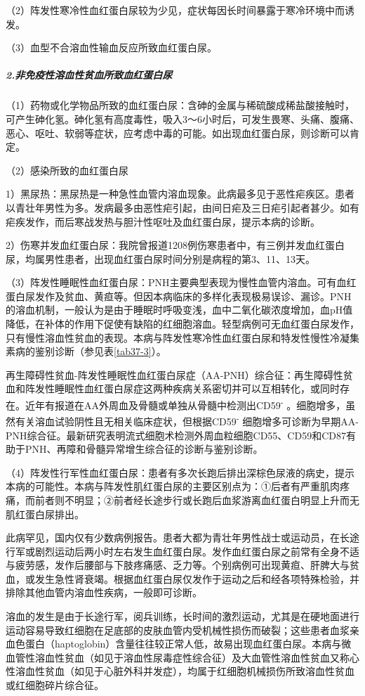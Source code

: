 （2）阵发性寒冷性血红蛋白尿较为少见，症状每因长时间暴露于寒冷环境中而诱发。

（3）血型不合溶血性输血反应所致血红蛋白尿。

\subparagraph{2.非免疫性溶血性贫血所致血红蛋白尿}

（1）药物或化学物品所致的血红蛋白尿：含砷的金属与稀硫酸成稀盐酸接触时，可产生砷化氢。砷化氢有高度毒性，吸入3～6小时后，可发生畏寒、头痛、腹痛、恶心、呕吐、软弱等症状，应考虑中毒的可能。如出现血红蛋白尿，则诊断可以肯定。

（2）感染所致的血红蛋白尿

1）黑尿热：黑尿热是一种急性血管内溶血现象。此病最多见于恶性疟疾区。患者以青壮年男性为多。发病最多由恶性疟引起，由间日疟及三日疟引起者甚少。如有疟疾发作，而后寒战发热与胆汁性呕吐及血红蛋白尿，提示本病的诊断。

2）伤寒并发血红蛋白尿：我院曾报道1208例伤寒患者中，有三例并发血红蛋白尿，均属男性患者，出现血红蛋白尿时间分别是病程的第3、11、13天。

（3）阵发性睡眠性血红蛋白尿：PNH主要典型表现为慢性血管内溶血。可有血红蛋白尿发作及贫血、黄疸等。但因本病临床的多样化表现极易误诊、漏诊。PNH的溶血机制，一般认为是由于睡眠时呼吸变浅，血中二氧化碳浓度增加，血pH值降低，在补体的作用下促使有缺陷的红细胞溶血。轻型病例可无血红蛋白尿发作，只有慢性溶血性贫血的表现。本病与阵发性寒冷性血红蛋白尿和特发性慢性冷凝集素病的鉴别诊断（参见表\ref{tab37-3}）。

再生障碍性贫血-阵发性睡眠性血红蛋白尿症（AA-PNH）综合征：再生障碍性贫血和阵发性睡眠性血红蛋白尿症这两种疾病关系密切并可以互相转化，或同时存在。近年有报道在AA外周血及骨髓或单独从骨髓中检测出CD59\textsuperscript{-}
。细胞增多，虽然有关溶血试验阴性且无相关临床症状，但根据CD59\textsuperscript{-}
细胞增多可诊断为早期AA-PNH综合征。最新研究表明流式细胞术检测外周血粒细胞CD55、CD59和CD87有助于PNH、再障和骨髓异常增生综合征的诊断与鉴别诊断。

（4）阵发性行军性血红蛋白尿：患者有多次长跑后排出深棕色尿液的病史，提示本病的可能性。本病与阵发性肌红蛋白尿的主要区别点为：①后者有严重肌肉疼痛，而前者则不明显；②前者经长途步行或长跑后血浆游离血红蛋白明显上升而无肌红蛋白尿排出。

此病罕见，国内仅有少数病例报告。患者大都为青壮年男性战士或运动员，在长途行军或剧烈运动后两小时左右发生血红蛋白尿。发作血红蛋白尿之前常有全身不适与疲劳感，发作后腰部与下肢疼痛感、乏力等。个别病例可出现黄疸、肝脾大与贫血，或发生急性肾衰竭。根据血红蛋白尿仅发作于运动之后和经各项特殊检验，并排除其他血管内溶血性疾病，一般即可诊断。

溶血的发生是由于长途行军，阅兵训练，长时间的激烈运动，尤其是在硬地面进行运动容易导致红细胞在足底部的皮肤血管内受机械性损伤而破裂；这些患者血浆亲血色蛋白（haptoglobin）含量往往较正常人低，故易出现血红蛋白尿。本病与微血管性溶血性贫血（如见于溶血性尿毒症性综合征）及大血管性溶血性贫血又称心性溶血性贫血（如见于心脏外科并发症），均属于红细胞机械损伤所致溶血性贫血或红细胞碎片综合征。

